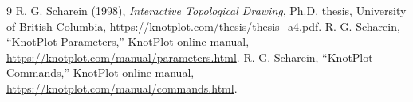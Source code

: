 \begin{thebibliography}{9}
 R. G. Scharein (1998),
\emph{Interactive Topological Drawing}, Ph.D. thesis, University of British Columbia,
\url{https://knotplot.com/thesis/thesis_a4.pdf}.
 R. G. Scharein,
``KnotPlot Parameters,'' KnotPlot online manual,
\url{https://knotplot.com/manual/parameters.html}.
 R. G. Scharein,
``KnotPlot Commands,'' KnotPlot online manual,
\url{https://knotplot.com/manual/commands.html}.
\end{thebibliography}
